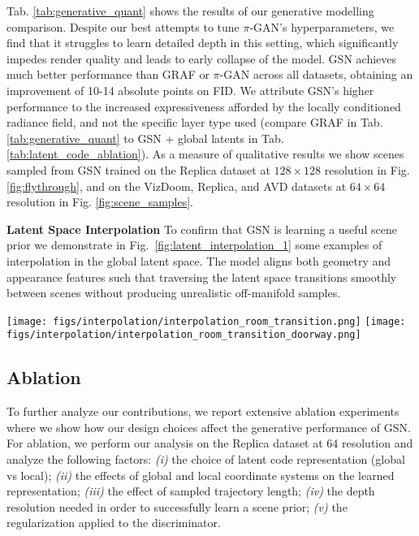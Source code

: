 \documentclass[10pt,twocolumn,letterpaper]{article}
\begin{document}
Tab. \ref{tab:generative_quant} shows the results of our generative modelling comparison. Despite our best attempts to tune $\pi$-GAN's hyperparameters, we find that it struggles to learn detailed depth in this setting, which significantly impedes render quality and leads to early collapse of the model. GSN achieves much better performance than GRAF or $\pi$-GAN across all datasets, obtaining an improvement of 10-14 absolute points on FID. We attribute GSN's higher performance to the increased expressiveness afforded by the locally conditioned radiance field, and not the specific layer type used (compare GRAF in Tab. \ref{tab:generative_quant} to GSN + global latents in Tab. \ref{tab:latent_code_ablation}). As a measure of qualitative results we show scenes sampled from GSN trained on the Replica dataset at $128\times128$ resolution in Fig. \ref{fig:flythrough}, and on the VizDoom, Replica, and AVD datasets at $64\times64$ resolution in Fig. \ref{fig:scene_samples}.

\textbf{Latent Space Interpolation} To confirm that GSN is learning a useful scene prior we demonstrate in Fig.~\ref{fig:latent_interpolation_1} some examples of interpolation in the global latent space. The model aligns both geometry and appearance features such that traversing the latent space transitions smoothly between scenes without producing unrealistic off-manifold samples. 

\begin{figure*}[t]
    \centering
    \texttt{[image: figs/interpolation/interpolation\_room\_transition.png]}
    \texttt{[image: figs/interpolation/interpolation\_room\_transition\_doorway.png]}
    \caption{Two example latent interpolations between global latent codes $\textbf{z}$. Scenes transition smoothly by aligning geometry features such as walls (top) and appearance features such as the picture frame and doorway (bottom). Views are rendered from a fixed camera pose.}
    \label{fig:latent_interpolation_1}
\end{figure*}

\subsection{Ablation}

To further analyze our contributions, we report extensive ablation experiments where we show how our design choices affect the generative performance of GSN. For ablation, we perform our analysis on the Replica dataset \cite{replica} at 64  resolution and analyze the following factors: \textit{(i)} the choice of latent code representation (global vs local); \textit{(ii)} the effects of global and local coordinate systems on the learned representation; \textit{(iii)} the effect of sampled trajectory length; \textit{(iv)} the depth resolution needed in order to successfully learn a scene prior; \textit{(v)} the regularization applied to the discriminator.
\end{document}
